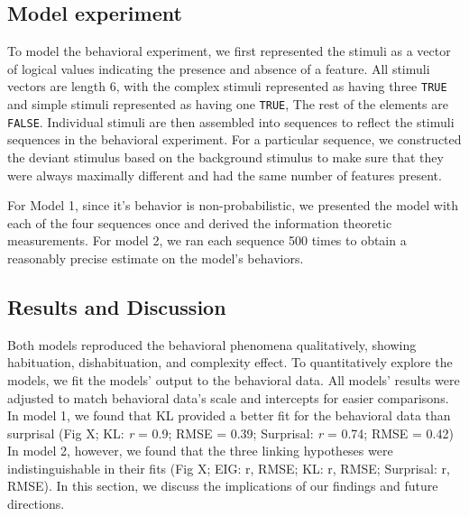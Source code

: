 \documentclass[10pt, letterpaper]{article}
\begin{document}
\hypertarget{model-experiment}{%
\subsection{Model experiment}\label{model-experiment}}

To model the behavioral experiment, we first represented the stimuli as
a vector of logical values indicating the presence and absence of a
feature. All stimuli vectors are length 6, with the complex stimuli
represented as having three \texttt{TRUE} and simple stimuli represented
as having one \texttt{TRUE}, The rest of the elements are
\texttt{FALSE}. Individual stimuli are then assembled into sequences to
reflect the stimuli sequences in the behavioral experiment. For a
particular sequence, we constructed the deviant stimulus based on the
background stimulus to make sure that they were always maximally
different and had the same number of features present.

For Model 1, since it's behavior is non-probabilistic, we presented the
model with each of the four sequences once and derived the information
theoretic measurements. For model 2, we ran each sequence 500 times to
obtain a reasonably precise estimate on the model's behaviors.

\hypertarget{results-and-discussion}{%
\subsection{Results and Discussion}\label{results-and-discussion}}

Both models reproduced the behavioral phenomena qualitatively, showing
habituation, dishabituation, and complexity effect. To quantitatively
explore the models, we fit the models' output to the behavioral data.
All models' results were adjusted to match behavioral data's scale and
intercepts for easier comparisons. In model 1, we found that KL provided
a better fit for the behavioral data than surprisal (Fig X; KL: \emph{r}
= 0.9; RMSE = 0.39; Surprisal: \emph{r} = 0.74; RMSE = 0.42) In model 2,
however, we found that the three linking hypotheses were
indistinguishable in their fits (Fig X; EIG: r, RMSE; KL: r, RMSE;
Surprisal: r, RMSE). In this section, we discuss the implications of our
findings and future directions.
\end{document}
